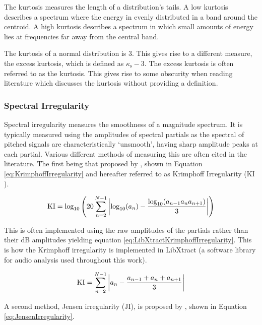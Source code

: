 			The kurtosis measures the length of a distribution's tails. A low kurtosis describes a spectrum
			where the energy in evenly distributed in a band around the centroid. A high kurtosis describes a
			spectrum in which small amounts of energy lies at frequencies far away from the central band.

			The kurtosis of a normal distribution is 3. This gives rise to a different measure, the excess
			kurtosis, which is defined as $\kappa_{\textrm{s}} - 3$. The excess kurtosis is often referred to
			as the kurtosis. This gives rise to some obscurity when reading literature which discusses the
			kurtosis without providing a definition.

		\subsubsection*{Spectral Irregularity}
			Spectral irregularity measures the smoothness of a magnitude spectrum. It is typically measured
			using the amplitudes of spectral partials as the spectral of pitched signals are characteristically
			`unsmooth', having sharp amplitude peaks at each partial. Various different methods of measuring
			this are often cited in the literature. The first being that proposed by
			\citet{krimphoff1994caracterisation}, shown in Equation \ref{eq:KrimphoffIrregularity} and
			hereafter referred to as Krimphoff Irregularity ($\textrm{KI}$).

			\begin{equation}
				\textrm{KI} = \log_{10} \left( 20 \sum_{n = 2}^{N - 1}
						   \left|\log_{10}(a_{n}) - \frac{\log_{10}(a_{n-1}a_{n}a_{n+1})}{3}\right|
						   \right)
				\label{eq:KrimphoffIrregularity}
			\end{equation}

			This is often implemented using the raw amplitudes of the partials rather than their dB amplitudes
			yielding equation \ref{eq:LibXtractKrimphoffIrregularity}. This is how the Krimphoff irregularity
			is implemented in LibXtract \citep{bullock2007libxtract} (a software library for audio analysis
			used throughout this work).

			\begin{equation}
				\textrm{KI} = \sum_{n = 2}^{N - 1}
						  \left|a_{n} - \frac{a_{n-1} + a_{n} + a_{n+1}}{3}\right|
				\label{eq:LibXtractKrimphoffIrregularity}
			\end{equation}

			A second method, Jensen irregularity ($\textrm{JI}$), is proposed by \citet{jensen1999timbre},
			shown in Equation \ref{eq:JensenIrregularity}.

